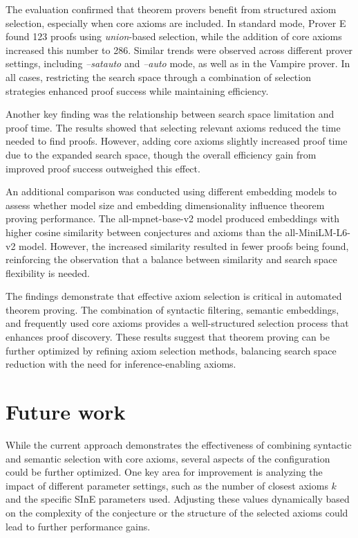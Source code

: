 \documentclass[english,version-2020-11]{uzl-thesis}
\begin{document}
The evaluation confirmed that theorem provers benefit from structured axiom selection, especially when core axioms are included. In standard mode, Prover E found 123 proofs using \textit{union}-based selection, while the addition of core axioms increased this number to 286. Similar trends were observed across different prover settings, including \textit{--satauto} and \textit{--auto} mode, as well as in the Vampire prover. In all cases, restricting the search space through a combination of selection strategies enhanced proof success while maintaining efficiency.

Another key finding was the relationship between search space limitation and proof time. The results showed that selecting relevant axioms reduced the time needed to find proofs. However, adding core axioms slightly increased proof time due to the expanded search space, though the overall efficiency gain from improved proof success outweighed this effect.

An additional comparison was conducted using different embedding models to assess whether model size and embedding dimensionality influence theorem proving performance. The all-mpnet-base-v2 model produced embeddings with higher cosine similarity between conjectures and axioms than the all-MiniLM-L6-v2 model. However, the increased similarity resulted in fewer proofs being found, reinforcing the observation that a balance between similarity and search space flexibility is needed. 

The findings demonstrate that effective axiom selection is critical in automated theorem proving. The combination of syntactic filtering, semantic embeddings, and frequently used core axioms provides a well-structured selection process that enhances proof discovery. These results suggest that theorem proving can be further optimized by refining axiom selection methods, balancing search space reduction with the need for inference-enabling axioms.

\chapter{Future work}
\label{chapter-futerwork}

While the current approach demonstrates the effectiveness of combining syntactic and semantic selection with core axioms, several aspects of the configuration could be further optimized. One key area for improvement is analyzing the impact of different parameter settings, such as the number of closest axioms \( k \) and the specific SInE parameters used. Adjusting these values dynamically based on the complexity of the conjecture or the structure of the selected axioms could lead to further performance gains.
\end{document}
